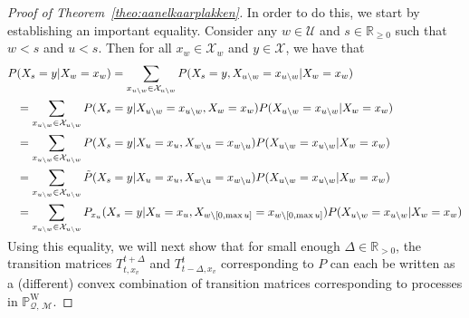 \documentclass[10pt,a4paper]{paper}
\theoremstyle{definition}
\newcommand{\reals}{\mathbb{R}}
\newcommand{\realspos}{\reals_{>0}}
\newcommand{\states}{\mathcal{X}}
\newcommand{\processes}{\mathbb{P}}
\newcommand{\wprocesses}{\processes^{\mathrm{W}}}
\newcommand{\rateset}{\mathcal{Q}}
\begin{document}
\begin{proof}[Proof of Theorem~\ref{theo:aanelkaarplakken}]
In order to do this, we start by establishing an important equality.
Consider any $w\in\mathcal{U}$ and $s\in\reals_{\geq0}$ such that $w<s$ and $u<s$. Then for all $x_w\in\states_w$ and $y\in\states$, we have that
\begin{align}\label{eq:theo:aanelkaarplakken:convexcombo}
P&(X_s=y\vert X_w=x_w)
=
\sum_{x_{u\setminus w}\in\states_{u\setminus w}}
P(X_s=y,
X_{u\setminus w}=x_{u\setminus w}
\vert X_w=x_w)\notag\\
&=
\sum_{x_{u\setminus w}\in\states_{u\setminus w}}
P(X_s=y\vert
X_{u\setminus w}=x_{u\setminus w}, X_w=x_w)
P(X_{u\setminus w}=x_{u\setminus w}
\vert X_w=x_w)\notag\\
&=
\sum_{x_{u\setminus w}\in\states_{u\setminus w}}
P(X_s=y\vert
X_{u}=x_{u}, X_{w\setminus u}=x_{w\setminus u})
P(X_{u\setminus w}=x_{u\setminus w}
\vert X_w=x_w)\notag\\
&=
\sum_{x_{u\setminus w}\in\states_{u\setminus w}}
\tilde{P}(X_s=y\vert
X_{u}=x_{u}, X_{w\setminus u}=x_{w\setminus u})
P(X_{u\setminus w}=x_{u\setminus w}
\vert X_w=x_w)\notag\\
&=
\sum_{x_{u\setminus w}\in\states_{u\setminus w}}
P_{x_u}(X_s=y\vert
X_{u}=x_{u}, X_{w\setminus [0,\max u]}=x_{w\setminus [0,\max u]})
P(X_{u\setminus w}=x_{u\setminus w}
\vert X_w=x_w)\notag\\[-3mm]
\end{align}

Using this equality, we will next show that for small enough $\Delta\in\realspos$, the transition matrices $T_{t,x_v}^{t+\Delta}$ and $T_{t-\Delta,x_v}^t$ corresponding to $P$ can each be written as a (different) convex combination of transition matrices corresponding to processes in $\wprocesses_{\rateset,\,\mathcal{M}}$.


\end{proof}
\end{document}
